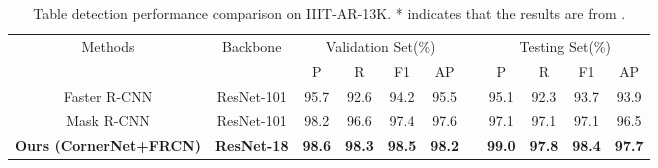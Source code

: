 \documentclass[final,3p,times,twocolumn]{elsarticle}
\begin{document}
\begin{table*}[t]
\footnotesize
    \centering
    \caption{Table detection performance comparison on the validation set of PubLayNet. * indicates that the results are from \cite{zhong2019publaynet}.} 
    \label{tab:PubLayNet}
\end{table*}
\begin{table*}[h!]
\footnotesize
    \centering
    \caption{Table detection performance comparison on IIIT-AR-13K. * indicates that the results are from \cite{mondal2020iiit}.}
    \label{tab:IIIT-AR-13K}
    \begin{tabular}{ c  c  c  c  c  c  c  c  c  c  c }
        \toprule
        \multirow{2}{*}{Methods} &
        \multirow{2}{*}{Backbone} & \multicolumn{4}{c}{Validation Set(\%)} && \multicolumn{4}{c}{Testing Set(\%)} \\\cline{3-6}\cline{8-11}
         && P & R & F1 & AP && P & R & F1 & AP\\
        \midrule
        Faster R-CNN & ResNet-101 & 95.7 & 92.6 & 94.2 & 95.5 && 95.1 & 92.3 & 93.7 & 93.9 \\
        Mask R-CNN & ResNet-101 & 98.2 & 96.6 & 97.4 & 97.6 && 97.1 & 97.1 & 97.1 & 96.5 \\
        \midrule
        \textbf{Ours (CornerNet+FRCN)} & \textbf{ResNet-18} & \textbf{98.6} & \textbf{98.3} & \textbf{98.5} & \textbf{98.2} && \textbf{99.0} & \textbf{97.8} & \textbf{98.4} & \textbf{97.7} \\
        \bottomrule
    \end{tabular}
\end{table*}
\end{document}
